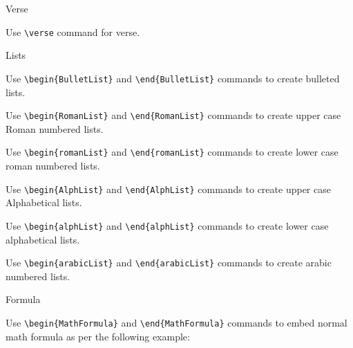 \documentclass[12pt,Bold,letterpaper,TexShade]{mcgilletdclass}
\numberwithin{equation}{section}
\begin{document}
\begin{BulletList}
		\item{Verse}
			\begin{romanList}
			\item{Use \verb=\verse= command for verse. }
			\end{romanList}
		\item{Lists}
			\begin{romanList}
			\item{Use \verb=\begin{BulletList}= and \verb=\end{BulletList}= commands to create bulleted lists. }
			\item{Use \verb=\begin{RomanList}= and \verb=\end{RomanList}= commands to create upper case Roman numbered lists. }
			\item{Use \verb=\begin{romanList}= and \verb=\end{romanList}= commands to create lower case roman numbered lists. }
			\item{Use \verb=\begin{AlphList}= and \verb=\end{AlphList}= commands to create upper case Alphabetical lists. }
			\item{Use \verb=\begin{alphList}= and \verb=\end{alphList}= commands to create lower case alphabetical lists. }
			\item{Use \verb=\begin{arabicList}= and \verb=\end{arabicList}= commands to create arabic numbered lists. }
			\end{romanList}
		\item{Formula}
			\begin{romanList}
			\item{Use \verb=\begin{MathFormula}= and \verb=\end{MathFormula}= commands to embed normal math formula as per the following example:}
\end{romanList}
\end{BulletList}
\end{document}
